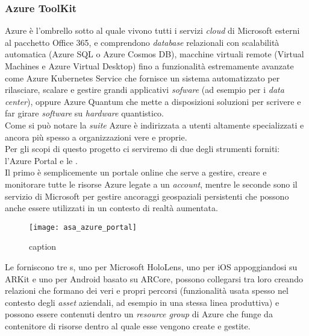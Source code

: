 \subsubsection{Azure ToolKit}
Azure è l'ombrello sotto al quale vivono tutti i servizi \textit{cloud} di Microsoft esterni al pacchetto Office 365, e comprendono \textit{database} relazionali con scalabilità automatica (Azure SQL o Azure Cosmos DB), macchine virtuali remote (Virtual Machines e Azure Virtual Desktop) fino a funzionalità estremamente avanzate come Azure Kubernetes Service che fornisce un sistema automatizzato per rilasciare, scalare e gestire grandi applicativi \textit{sofware} (ad esempio per i \textit{data center}), oppure Azure Quantum che mette a disposizioni soluzioni per scrivere e far girare \textit{software} su \textit{hardware} quantistico.\\
Come si può notare la \textit{suite} Azure è indirizzata a utenti altamente specializzati e ancora più spesso a organizzazioni vere e proprie.\\
Per gli scopi di questo progetto ci serviremo di due degli strumenti forniti: l'Azure Portal e le \asa{}.\\
Il primo è semplicemente un portale online che serve a gestire, creare e monitorare tutte le risorse Azure legate a un \textit{account}, mentre le seconde sono il servizio di Microsoft per gestire ancoraggi geospaziali persistenti che possono anche essere utilizzati in un contesto di realtà aumentata.

\begin{figure}[H]
  \centering
  \texttt{[image: asa\_azure\_portal]}
  \caption[Azure Portal]{caption \todo}
\end{figure}

Le \asa{} forniscono tre \sdk{}s, uno per Microsoft HoloLens, uno per iOS appoggiandosi su ARKit e uno per Android basato su ARCore, possono collegarsi tra loro creando relazioni che formano dei veri e propri percorsi (funzionalità usata spesso nel contesto degli \textit{asset} aziendali, ad esempio in una stessa linea produttiva) e possono essere contenuti dentro un \textit{resource group} di Azure che funge da contenitore di risorse dentro al quale esse vengono create e gestite.

